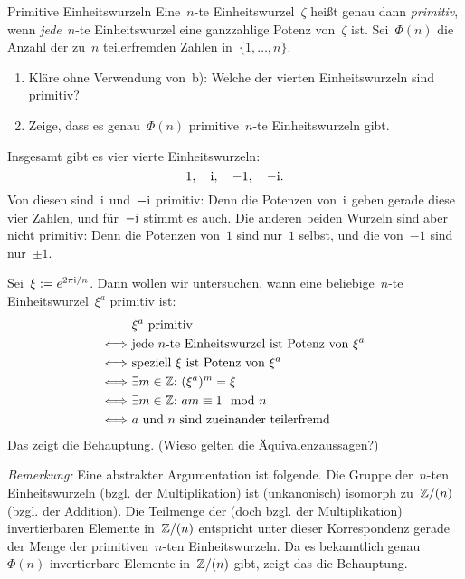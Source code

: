 \documentclass{algblatt}
\begin{document}
\ifloesungen\newpage\fi
\begin{aufgabe}{Primitive Einheitswurzeln}
Eine~$n$-te Einheitswurzel~$\zeta$ heißt genau dann \emph{primitiv}, wenn
\emph{jede}~$n$-te Einheitswurzel eine ganzzahlige Potenz von~$\zeta$ ist.
Sei~$\Phi(n)$ die Anzahl der zu~$n$ teilerfremden Zahlen
in~$\{1,\ldots,n\}$.
\begin{enumerate}
\item Kläre ohne Verwendung von~b): Welche der vierten Einheitswurzeln sind
primitiv?
\item Zeige, dass es genau~$\Phi(n)$ primitive~$n$-te
Einheitswurzeln gibt.
\end{enumerate}
\begin{loesungE}
\item Insgesamt gibt es vier vierte Einheitswurzeln:
\[ 1,\quad \mathrm{i},\quad -1,\quad -\mathrm{i}. \]
Von diesen sind~$\mathrm{i}$ und~$-\mathrm{i}$ primitiv: Denn die Potenzen von~$\mathrm{i}$ geben
gerade diese vier Zahlen, und für~$-\mathrm{i}$ stimmt es auch. Die anderen beiden
Wurzeln sind aber nicht primitiv: Denn die Potenzen von~$1$ sind nur~$1$
selbst, und die von~$-1$ sind nur~$\pm 1$.

\item Sei~$\xi := e^{2\pi\mathrm{i}/n}$. Dann wollen wir untersuchen, wann eine
beliebige~$n$-te Einheitswurzel~$\xi^a$ primitiv ist:
\begin{align*}
  & \text{$\xi^a$ primitiv} \\
  \Longleftrightarrow\ &
    \text{jede $n$-te Einheitswurzel ist Potenz von~$\xi^a$} \\
  \Longleftrightarrow\ &
    \text{speziell~$\xi$ ist Potenz von~$\xi^a$} \\
  \Longleftrightarrow\ &
    \exists m \in \ZZ{:}\ 
    (\xi^a)^m = \xi \\
  \Longleftrightarrow\ &
    \exists m \in \ZZ{:}\ 
    am \equiv 1 \mod n \\
  \Longleftrightarrow\ &
    \text{$a$ und $n$ sind zueinander teilerfremd}
\end{align*}
Das zeigt die Behauptung. (Wieso gelten die Äquivalenzaussagen?)

\emph{Bemerkung:} Eine abstrakter Argumentation ist folgende. Die Gruppe
der~$n$-ten Einheitswurzeln (bzgl. der Multiplikation) ist (unkanonisch)
isomorph zu~$\mathbb{Z}/(n)$ (bzgl. der Addition). Die Teilmenge der (doch bzgl. der
Multiplikation) invertierbaren Elemente in~$\mathbb{Z}/(n)$ entspricht unter dieser
Korrespondenz gerade der Menge der primitiven~$n$-ten Einheitswurzeln. Da es
bekanntlich genau~$\Phi(n)$ invertierbare Elemente in~$\mathbb{Z}/(n)$ gibt, zeigt das
die Behauptung.
\end{loesungE}
\end{aufgabe}
\end{document}
